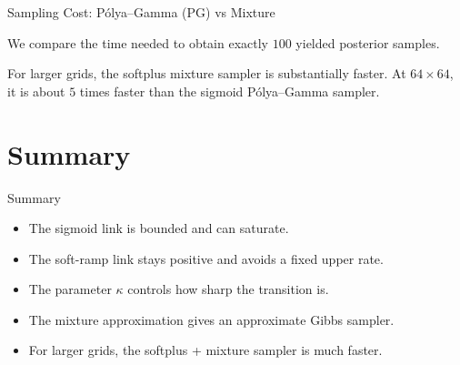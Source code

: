 \documentclass[11pt]{beamer}
\begin{document}
\begin{frame}{Sampling Cost: P\'olya--Gamma (PG) vs Mixture}
\small

We compare the time needed to obtain exactly \(100\) yielded posterior samples.

\medskip
\begin{center}
\end{center}

\medskip

\begin{alertblock}{}
For larger grids, the softplus mixture sampler is substantially faster.
At \(64\times64\), it is about \(5\) times faster than the sigmoid P\'olya--Gamma sampler.
\end{alertblock}


\end{frame}



\section{Summary}

\begin{frame}{Summary}
\begin{itemize}
\item The sigmoid link is bounded and can saturate.

\medskip

\item The soft-ramp link stays positive and avoids a fixed upper rate.

\medskip

\item The parameter \(\kappa\) controls how sharp the transition is.

\medskip

\item The mixture approximation gives an approximate Gibbs sampler.

\medskip

\item For larger grids, the softplus + mixture sampler is much faster.
\end{itemize}
\end{frame}
\end{document}
